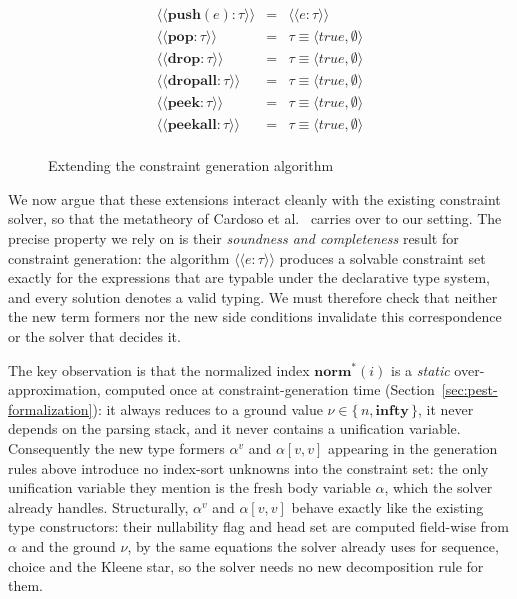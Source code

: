 \documentclass[preprint,12pt]{elsarticle}
\theoremstyle{definition}
\begin{document}
\begin{figure}[H]
  \[
    \begin{array}{lcl}
      \langle\langle \mathbf{push}(e) : \tau\rangle\rangle & = & \langle\langle e : \tau \rangle\rangle \\
      \langle\langle \mathbf{pop} : \tau \rangle\rangle & = & \tau \equiv \langle true, \emptyset \rangle\\
      \langle\langle \mathbf{drop} : \tau \rangle\rangle & = & \tau \equiv \langle true, \emptyset \rangle\\
      \langle\langle \mathbf{dropall} : \tau \rangle\rangle & = & \tau \equiv \langle true, \emptyset \rangle\\
      \langle\langle \mathbf{peek} : \tau \rangle\rangle & = & \tau \equiv \langle true, \emptyset \rangle\\
      \langle\langle \mathbf{peekall} : \tau \rangle\rangle & = & \tau \equiv \langle true, \emptyset \rangle\\
    \end{array}
  \]
  \caption{Extending the constraint generation algorithm}
  \label{fig:constraint-gen}
\end{figure}

We now argue that these extensions interact cleanly with the existing constraint
solver, so that the metatheory of Cardoso et al.~\cite{Cardoso23} carries over to
our setting. The precise property we rely on is their \emph{soundness and
completeness} result for constraint generation: the algorithm
$\langle\langle e : \tau\rangle\rangle$ produces a solvable constraint set exactly
for the expressions that are typable under the declarative type system, and every
solution denotes a valid typing. We must therefore check that neither the new
term formers nor the new side conditions invalidate this correspondence or the
solver that decides it.

The key observation is that the normalized index $\mathbf{norm}^{\ast}(i)$ is a
\emph{static} over-approximation, computed once at constraint-generation time
(Section~\ref{sec:pest-formalization}): it always reduces to a ground value
$\nu \in \{\, n, \mathbf{infty}\,\}$, it never depends on the parsing stack, and it
never contains a unification variable. Consequently the new type formers
$\alpha^{v}$ and $\alpha[v,v]$ appearing in the generation rules above introduce
no index-sort unknowns into the constraint set: the only unification variable they
mention is the fresh body variable $\alpha$, which the solver already handles.
Structurally, $\alpha^{v}$ and $\alpha[v,v]$ behave exactly like the existing type
constructors: their nullability flag and head set are computed field-wise from
$\alpha$ and the ground $\nu$, by the same equations the solver already uses for
sequence, choice and the Kleene star, so the solver needs no new decomposition
rule for them.
\end{document}
